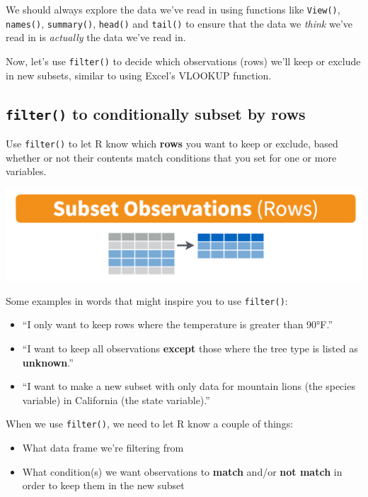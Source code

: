 \documentclass[]{book}
\providecommand{\tightlist}{%
  \setlength{\itemsep}{0pt}\setlength{\parskip}{0pt}}
\begin{document}
We should always explore the data we've read in using functions like \texttt{View()}, \texttt{names()}, \texttt{summary()}, \texttt{head()} and \texttt{tail()} to ensure that the data we \emph{think} we've read in is \emph{actually} the data we've read in.

Now, let's use \texttt{filter()} to decide which observations (rows) we'll keep or exclude in new subsets, similar to using Excel's VLOOKUP function.

\hypertarget{filter-to-conditionally-subset-by-rows}{%
\subsection{\texorpdfstring{\texttt{filter()} to conditionally subset by rows}{filter() to conditionally subset by rows}}\label{filter-to-conditionally-subset-by-rows}}

Use \texttt{filter()} to let R know which \textbf{rows} you want to keep or exclude, based whether or not their contents match conditions that you set for one or more variables.

\includegraphics{img/rstudio-cheatsheet-filter.png}

Some examples in words that might inspire you to use \texttt{filter()}:

\begin{itemize}
\tightlist
\item
  ``I only want to keep rows where the temperature is greater than 90°F.''
\item
  ``I want to keep all observations \textbf{except} those where the tree type is listed as \textbf{unknown}.''
\item
  ``I want to make a new subset with only data for mountain lions (the species variable) in California (the state variable).''
\end{itemize}

When we use \texttt{filter()}, we need to let R know a couple of things:

\begin{itemize}
\tightlist
\item
  What data frame we're filtering from
\item
  What condition(s) we want observations to \textbf{match} and/or \textbf{not match} in order to keep them in the new subset
\end{itemize}
\end{document}
